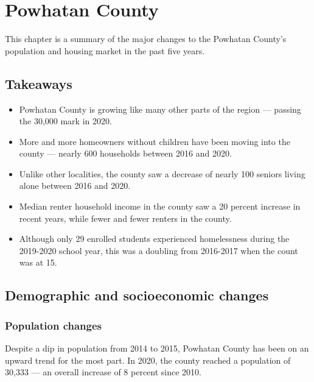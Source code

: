 \documentclass[
  letterpaper,
  DIV=11,
  numbers=noendperiod]{scrreprt}
\providecommand{\tightlist}{%
  \setlength{\itemsep}{0pt}\setlength{\parskip}{0pt}}\usepackage{longtable,booktabs,array}
\begin{document}
\hypertarget{part-4-9}{%
\chapter{Powhatan County}\label{part-4-9}}

This chapter is a summary of the major changes to the Powhatan County's
population and housing market in the past five years.

\hypertarget{takeaways-8}{%
\section{Takeaways}\label{takeaways-8}}

\begin{itemize}
\tightlist
\item
  Powhatan County is growing like many other parts of the region ---
  passing the 30,000 mark in 2020.
\item
  More and more homeowners without children have been moving into the
  county --- nearly 600 households between 2016 and 2020.
\item
  Unlike other localities, the county saw a decrease of nearly 100
  seniors living alone between 2016 and 2020.
\item
  Median renter household income in the county saw a 20 percent increase
  in recent years, while fewer and fewer renters in the county.
\item
  Although only 29 enrolled students experienced homelessness during the
  2019-2020 school year, this was a doubling from 2016-2017 when the
  count was at 15.
\end{itemize}

\hypertarget{demographic-and-socioeconomic-changes-8}{%
\section{Demographic and socioeconomic
changes}\label{demographic-and-socioeconomic-changes-8}}

\hypertarget{population-changes-8}{%
\subsection{Population changes}\label{population-changes-8}}

Despite a dip in population from 2014 to 2015, Powhatan County has been
on an upward trend for the most part. In 2020, the county reached a
population of 30,333 --- an overall increase of 8 percent since 2010.
\end{document}
